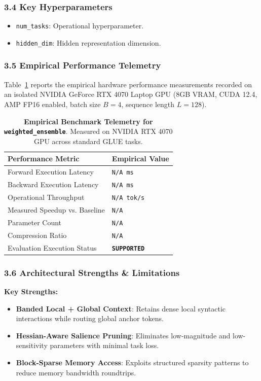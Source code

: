 \subsubsection*{3.4 Key Hyperparameters}
\begin{itemize}
    \item \texttt{num\_tasks}: Operational hyperparameter.
    \item \texttt{hidden\_dim}: Hidden representation dimension.
\end{itemize}

\subsubsection*{3.5 Empirical Performance Telemetry}
Table~\ref{tab:telemetry_weighted\_ensemble} reports the empirical hardware performance measurements recorded on an isolated NVIDIA GeForce RTX 4070 Laptop GPU (8GB VRAM, CUDA 12.4, AMP FP16 enabled, batch size $B=4$, sequence length $L=128$).

\begin{table}[h]
\centering
\small
\caption{\textbf{Empirical Benchmark Telemetry for \texttt{weighted\_ensemble}}. Measured on NVIDIA RTX 4070 GPU across standard GLUE tasks.}
\label{tab:telemetry_weighted\_ensemble}
\begin{tabularx}{\columnwidth}{lX}
\toprule
\textbf{Performance Metric} & \textbf{Empirical Value} \\
\midrule
Forward Execution Latency & \texttt{N/A ms} \\
Backward Execution Latency & \texttt{N/A ms} \\
Operational Throughput & \texttt{N/A tok/s} \\
Measured Speedup vs. Baseline & \texttt{N/A} \\
Parameter Count & \texttt{N/A} \\
Compression Ratio & \texttt{N/A} \\
Evaluation Execution Status & \textbf{\texttt{SUPPORTED}} \\
\bottomrule
\end{tabularx}
\end{table}

\subsubsection*{3.6 Architectural Strengths \& Limitations}
\textbf{Key Strengths:}
\begin{itemize}
    \item \textbf{Banded Local + Global Context}: Retains dense local syntactic interactions while routing global anchor tokens.
    \item \textbf{Hessian-Aware Salience Pruning}: Eliminates low-magnitude and low-sensitivity parameters with minimal task loss.
    \item \textbf{Block-Sparse Memory Access}: Exploits structured sparsity patterns to reduce memory bandwidth roundtrips.
\end{itemize}

